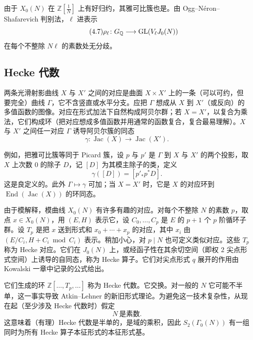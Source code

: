 由于 $X_0(N)$ 在 $\mathbb{Z}[\frac1N]$ 上有好归约，其雅可比簇也是。由 Ogg--Néron--Shafarevich 判别法，$\ell$ 进表示
\begin{equation}\tag{4.7}\label{c5:eq:4.7}
\rho_\ell\colon G_{\mathbb{Q}}\longrightarrow\mathrm{GL}(V_\ell J_0(N))
\end{equation}
在每个不整除 $N\ell$ 的素数处无分歧。

\subsection{Hecke 代数}\label{c5:sec:4.3}

两条光滑射影曲线 $X$ 与 $X'$ 之间的对应是曲面 $X\times X'$ 上的一条（可以可约，但要完全）曲线 $\Gamma$，它不含竖直或水平分支。应把 $\Gamma$ 想成从 $X$ 到 $X'$（或反向）的多值函数的图像。对应在形式加法下自然构成阿贝尔群；若 $X=X'$，以复合为乘法，它们构成环（把对应想成多值函数并用通常的函数复合，复合最易理解）。$X$ 与 $X'$ 之间任一对应 $\Gamma$ 诱导阿贝尔簇的同态
\begin{equation}\tag{4.8}\label{c5:eq:4.8}
\gamma\colon\operatorname{Jac}(X)\longrightarrow\operatorname{Jac}(X').
\end{equation}

例如，把雅可比簇等同于 Picard 簇，设 $p$ 与 $p'$ 是 $\Gamma$ 到 $X$ 与 $X'$ 的两个投影，取 $X$ 上次数 $0$ 的除子 $D$，记 $[D]$ 为其模主除子的类，定义
\begin{equation}\tag{4.9}\label{c5:eq:4.9}
\gamma([D])=[p'_*p^*D].
\end{equation}
这是良定义的。此外 $\Gamma\mapsto\gamma$ 可加；当 $X=X'$ 时，它是 $X$ 的对应环到 $\operatorname{End}(\operatorname{Jac}(X))$ 的环同态。

由于模解释，模曲线 $X_0(N)$ 有许多有趣的对应。对每个不整除 $N$ 的素数 $p$，取点 $x\in X_0(N)$，用 $(E,H)$ 表示它，设 $C_0,\dots,C_p$ 是 $E$ 的 $p+1$ 个 $p$ 阶循环子群。设 $T_p$ 是把 $x$ 送到形式和 $x_0+\cdots+x_p$ 的对应，其中 $x_i$ 由 $(E/C_i,H+C_i\bmod C_i)$ 表示。稍加小心，对 $p\mid N$ 也可定义类似对应。这些 $T_p$ 称为 Hecke 对应。它们在 $J_0(N)$ 上，或经函子性在其余切空间（即权 $2$ 尖点形式空间）上诱导的自同态，称为 Hecke 算子。它们对尖点形式 $q$ 展开的作用由 Kowalski 一章中记录的公式给出。

它们生成的环 $\mathbb{Z}[\dots,T_p,\dots]$ 称为 Hecke 代数。它交换。对一般的 $N$ 它可能不半单，这一事实导致 Atkin--Lehner 的新旧形式理论。为避免这一技术复杂性，从现在起（至少涉及 Hecke 代数时）假定
\begin{equation}\tag{4.10}\label{c5:eq:4.10}
N\ \text{是素数}.
\end{equation}
这意味着（有理）Hecke 代数是半单的，是域的乘积，因此 $S_2(\Gamma_0(N))$ 有一组同时为所有 Hecke 算子本征形式的本征形式基。

